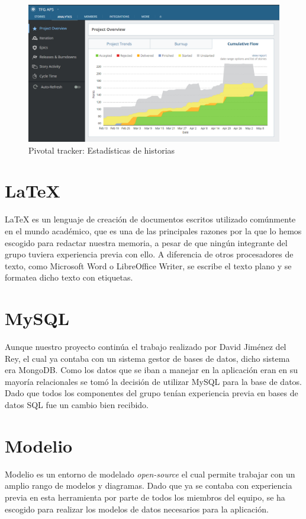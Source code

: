 \documentclass[11pt]{book}
\begin{document}
\begin{figure}
	\centering
	\includegraphics[scale=0.6]{pivotal}
	\caption{Pivotal tracker: Estadísticas de historias}
	\label{Figura 2}
\end{figure}

\section{LaTeX}
LaTeX es un lenguaje de creación de documentos escritos utilizado comúnmente en el mundo académico, que es una de las principales razones por la que lo hemos escogido para redactar nuestra memoria, a pesar de que ningún integrante del grupo tuviera experiencia previa con ello. A diferencia de otros procesadores de texto, como Microsoft Word o LibreOffice Writer, se escribe el texto plano y se formatea dicho texto con etiquetas. 

\section{MySQL}
Aunque nuestro proyecto continúa el trabajo realizado por David Jiménez del Rey, el cual ya contaba con un sistema gestor de bases de datos, dicho sistema era MongoDB. Como los datos que se iban a manejar en la aplicación eran en su mayoría relacionales se tomó la decisión de utilizar MySQL para la base de datos. Dado que todos los componentes del grupo tenían experiencia previa en bases de datos SQL fue un cambio bien recibido.

\section{Modelio}	
Modelio es un entorno de modelado \emph{open-source} el cual permite trabajar con un amplio rango de modelos y diagramas. Dado que ya se contaba con experiencia previa en esta herramienta por parte de todos los miembros del equipo, se ha escogido para realizar los modelos de datos necesarios para la aplicación.
\end{document}
